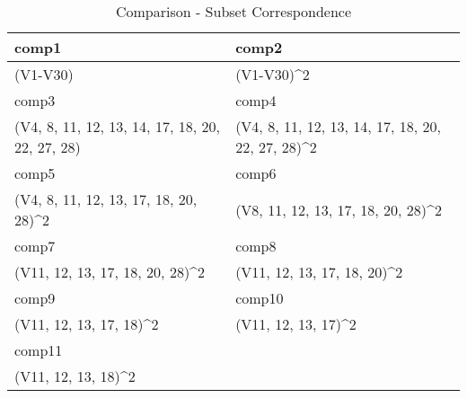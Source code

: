 \documentclass[11pt a4paper]{article}
\begin{document}
	\begin{table}[H]
		\centering
		\caption{Comparison - Subset Correspondence}
		\begin{tabular}{|l|l|}
			\hline
			comp1                                                  & comp2                                                              \\ \hline
			(V1-V30)                                               & (V1-V30)\textasciicircum{}2                                        \\ \hline
			comp3                                                  & comp4                                                              \\ \hline
			(V4, 8, 11, 12, 13, 14, 17, 18, 20, 22, 27, 28)        & (V4, 8, 11, 12, 13, 14, 17, 18, 20, 22, 27, 28)\textasciicircum{}2 \\ \hline
			comp5                                                  & comp6                                                              \\ \hline
			(V4, 8, 11, 12, 13, 17, 18, 20, 28)\textasciicircum{}2 & (V8, 11, 12, 13, 17, 18, 20, 28)\textasciicircum{}2                \\ \hline
			comp7                                                  & comp8                                                              \\ \hline
			(V11, 12, 13, 17, 18, 20, 28)\textasciicircum{}2       & (V11, 12, 13, 17, 18, 20)\textasciicircum{}2                       \\ \hline
			comp9                                                  & comp10                                                             \\ \hline
			(V11, 12, 13, 17, 18)\textasciicircum{}2               & (V11, 12, 13, 17)\textasciicircum{}2                               \\ \hline
			comp11                                                 &                                                                    \\ \hline
			(V11, 12, 13, 18)\textasciicircum{}2                   &                                                                    \\ \hline
		\end{tabular}
		\label{tab: comp-subset}
	\end{table}
	
	
	
\end{document}

